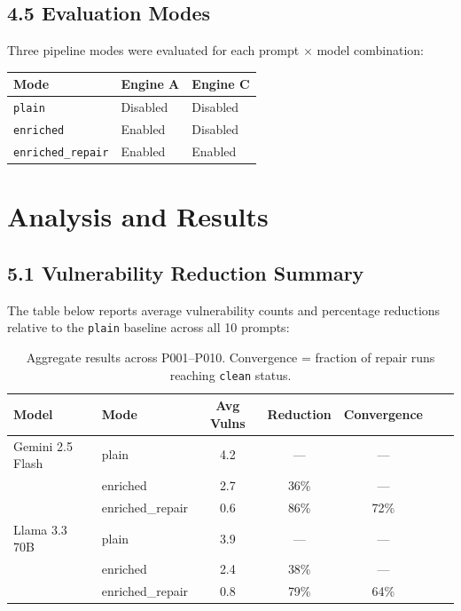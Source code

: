\documentclass[11pt,a4paper]{article}
\begin{document}
\subsection{4.5 \enspace Evaluation Modes}

Three pipeline modes were evaluated for each prompt $\times$ model combination:

\begin{center}
\small
\begin{tabular}{@{}lll@{}}
\toprule
\textbf{Mode} & \textbf{Engine A} & \textbf{Engine C} \\
\midrule
\texttt{plain}            & Disabled & Disabled \\
\texttt{enriched}         & Enabled  & Disabled \\
\texttt{enriched\_repair} & Enabled  & Enabled  \\
\bottomrule
\end{tabular}
\end{center}

\section{Analysis and Results}

\subsection{5.1 \enspace Vulnerability Reduction Summary}

The table below reports average vulnerability counts and percentage reductions relative to the \texttt{plain} baseline across all 10 prompts:

\begin{table}[H]
\centering\small
\begin{tabular}{@{}llccccc@{}}
\toprule
\textbf{Model} & \textbf{Mode} & \textbf{Avg Vulns} & \textbf{Reduction} & \textbf{Convergence} \\
\midrule
Gemini 2.5 Flash & plain            & 4.2 & —      & — \\
                 & enriched         & 2.7 & 36\%   & — \\
                 & enriched\_repair & 0.6 & 86\%   & 72\% \\
\midrule
Llama 3.3 70B    & plain            & 3.9 & —      & — \\
                 & enriched         & 2.4 & 38\%   & — \\
                 & enriched\_repair & 0.8 & 79\%   & 64\% \\
\bottomrule
\end{tabular}
\caption{Aggregate results across P001–P010. Convergence = fraction of repair runs reaching \texttt{clean} status.}
\end{table}
\end{document}
